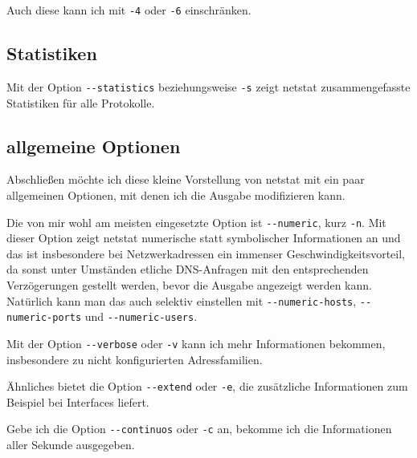 \begin{normaltext}
  Auch diese kann ich mit \verb?-4? oder \verb?-6? einschränken.

  \subsection*{Statistiken}
  \label{sec:netz-werkzeuge-netstat-statistics}

  Mit der Option \verb?--statistics? beziehungsweise \verb?-s? zeigt netstat
  zusammengefasste Statistiken für alle Protokolle.

  \subsection*{allgemeine Optionen}
  \label{sec:netz-werkzeuge-netstat-allgemein}

  Abschließen möchte ich diese kleine Vorstellung von netstat mit ein paar
  allgemeinen Optionen, mit denen ich die Ausgabe modifizieren kann.

  Die von mir wohl am meisten eingesetzte Option ist \verb?--numeric?, kurz
  \verb?-n?. Mit dieser Option zeigt netstat numerische statt symbolischer
  Informationen an und das ist insbesondere bei Netzwerkadressen ein immenser
  Geschwindigkeitsvorteil, da sonst unter Umständen etliche DNS-Anfragen mit
  den entsprechenden Verzögerungen gestellt werden, bevor die Ausgabe
  angezeigt werden kann. Natürlich kann man das auch selektiv einstellen mit
  \verb?--numeric-hosts?, \verb?--numeric-ports? und \verb?--numeric-users?.

  Mit der Option \verb?--verbose? oder \verb?-v? kann ich mehr Informationen
  bekommen, insbesondere zu nicht konfigurierten Adressfamilien.

  Ähnliches bietet die Option \verb?--extend? oder \verb?-e?, die zusätzliche
  Informationen zum Beispiel bei Interfaces liefert.

  Gebe ich die Option \verb?--continuos? oder \verb?-c? an, bekomme ich die
  Informationen aller Sekunde ausgegeben.
\end{normaltext}

